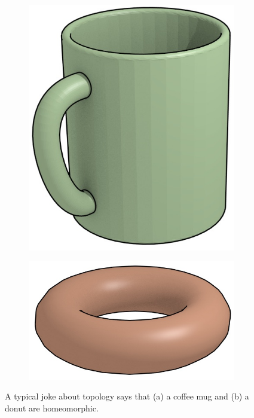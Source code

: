 \begin{figure}[htbp]
\centering
\begin{subfigure}[b]{0.4\linewidth}
\includegraphics[width=\linewidth]{figs/mug}
\caption{}%
\label{subfig:mug}
\end{subfigure}
\quad
\begin{subfigure}[b]{0.4\linewidth}
\includegraphics[width=\linewidth]{figs/donut}
\caption{}%
\label{subfig:donut}
\end{subfigure}
\caption{A typical joke about topology says that (a) a coffee mug and (b) a donut are homeomorphic.}%
\label{fig:homeomorphism}
\end{figure}

